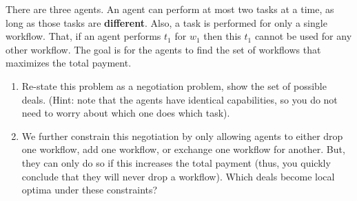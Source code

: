 \begin{exercises}
  There are three agents. An agent can perform at most two tasks at a
  time, as long as those tasks are \textbf{different}. Also, a task is
  performed for only a single workflow. That, if an agent performs
  $t_1$ for $w_1$ then this $t_1$ cannot be used for any other
  workflow. The goal is for the agents to find the set of workflows
  that maximizes the total payment.

  \begin{enumerate}
  \item Re-state this problem as a negotiation problem, show the set
    of possible deals. (Hint: note that the agents have identical
    capabilities, so you do not need to worry about which one does
    which task).


  \item We further constrain this negotiation by only allowing agents
    to either drop one workflow, add one workflow, or exchange one
    workflow for another. But, they can only do so if this increases
    the total payment (thus, you quickly conclude that they will never
    drop a workflow). Which deals become local optima under these
    constraints?

  \end{enumerate}
\end{exercises}








%



